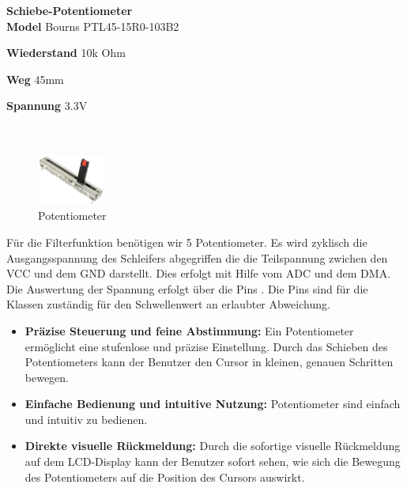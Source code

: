 \textbf{\hypertarget{Potentiometer}{Schiebe-Potentiometer}}\\

\textbf{Model} Bourns PTL45-15R0-103B2

\textbf{Wiederstand} 10k Ohm

\textbf{Weg} 45mm

\textbf{Spannung} 3.3V \\ \\ \\

	\begin{figure} %
	\vspace{-155pt + 0.02\textwidth}
	\hspace{0.07\textwidth} %
	\includegraphics[width=0.2\textwidth]{images/05_technische_spezifikation/Interface/Potentiometer.png} %
	\caption{Potentiometer}
	\label{fig:schiebe_potentiometer}
	\vspace{-20pt}
\end{figure}

Für die Filterfunktion benötigen wir 5 Potentiometer. Es wird zyklisch die Ausgangsspannung des Schleifers abgegriffen die die Teilspannung zwichen den VCC und dem GND darstellt. Dies erfolgt mit Hilfe vom ADC und dem DMA. Die Auswertung der Spannung erfolgt über die Pins  . Die Pins   sind für die Klassen zuständig   für den Schwellenwert an erlaubter Abweichung.

\begin{itemize}
	\item \textbf{Präzise Steuerung und feine Abstimmung:} Ein Potentiometer ermöglicht eine stufenlose und präzise Einstellung. Durch das Schieben des Potentiometers kann der Benutzer den Cursor in kleinen, genauen Schritten bewegen.
	\item \textbf{Einfache Bedienung und intuitive Nutzung:} Potentiometer sind einfach und intuitiv zu bedienen.
	\item \textbf{Direkte visuelle Rückmeldung:} Durch die sofortige visuelle Rückmeldung auf dem LCD-Display kann der Benutzer sofort sehen, wie sich die Bewegung des Potentiometers auf die Position des Cursors auswirkt.
\end{itemize}


